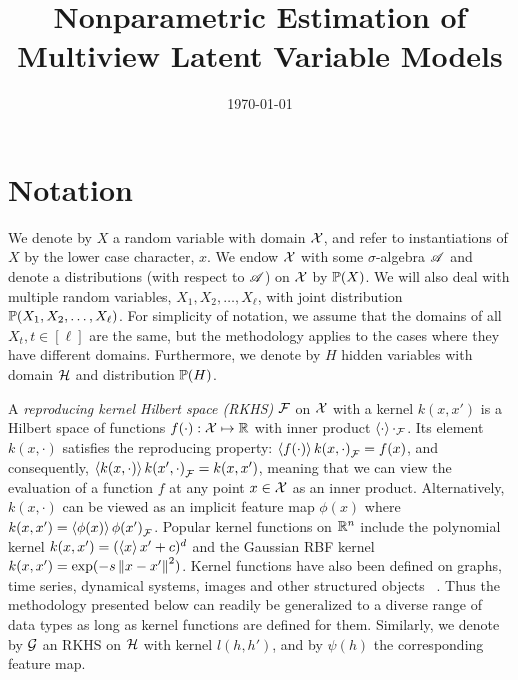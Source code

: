 \documentclass[11pt]{article}
\title{Nonparametric Estimation of Multiview Latent Variable Models}
\date{\today}
\begin{document}
\maketitle

\begin{abstract}


\end{abstract}

\section{Notation}

We denote by $X$ a random variable with domain $\mathcal{X}$,
and refer to instantiations of $X$ by the lower case character, $x$.
We endow $\mathcal{X}$ with some $\sigma$-algebra $\mathscr{A}$ and denote a distributions (with respect to $\mathscr{A}$) on $\mathcal{X}$ by $\mathbb{P}(X)$. We will also deal with multiple random variables, $X_1, X_2, \ldots, X_{\ell}$, with joint distribution $\mathbb{P}(X_1,X_2,\ldots,X_{\ell})$. For simplicity of notation, we assume that the domains of all $X_t, t \in [\ell]$ are the same, but the methodology applies to the cases where they have different domains. Furthermore, we denote by $H$ hidden variables with domain $\mathcal{H}$ and distribution $\mathbb{P}(H)$.

A \emph{reproducing kernel Hilbert space (RKHS)} $\mathcal{F}$ on $\mathcal{X}$ with a kernel $k(x,x')$ is a Hilbert space of
functions $f(\cdot):\mathcal{X} \mapsto \mathbb{R}$ with inner product $\left<\cdot\right>{\cdot}_{\mathcal{F}}$. Its element $k(x,\cdot)$ satisfies the reproducing property:
$\left<f(\cdot)\right>{k(x, \cdot)}_{\mathcal{F}} = f(x)$, and consequently, $\left<k(x,\cdot)\right>{k(x', \cdot)}_{\mathcal{F}} = k(x,x')$,
meaning that we can view the evaluation of a function $f$ at any point $x\in\mathcal{X}$ as an inner product. Alternatively, $k(x,\cdot)$ can  be viewed as an implicit feature map $\phi(x)$ where $k(x,x')=\left<\phi(x)\right>{\phi(x')}_{\mathcal{F}}$.
Popular kernel functions on $\mathbb{R}^n$ include the polynomial kernel $k(x,x') =
(\left<x\right>{x'}+c)^d$ and the Gaussian RBF kernel $k(x,x') = \exp(-s
  \left\|x-x'\right\|^2)$. Kernel functions have also been defined on
graphs, time series, dynamical systems, images and other structured
objects \, \citep{SchTsuVer04}. Thus the methodology presented below can  readily be generalized to a diverse range of data types as long as kernel functions are defined for them. Similarly, we denote by $\mathcal{G}$ an RKHS on $\mathcal{H}$ with kernel $l(h,h')$, and by $\psi(h)$ the corresponding feature map.
\end{document}
